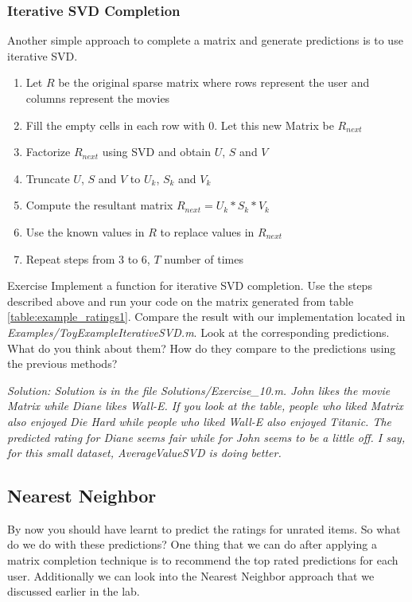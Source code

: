   \subsubsection{Iterative SVD Completion}
  Another simple approach to complete a matrix and generate predictions is to use iterative SVD. 
  \begin{enumerate}
    \item Let $R$ be the original sparse matrix where rows represent the user and columns represent the movies
    \item Fill the empty cells in each row with 0. Let this new Matrix be $R_{next}$
    \item Factorize $R_{next}$ using SVD and obtain $U$, $S$ and $V$
    \item Truncate $U$, $S$ and $V$ to $U_k$, $S_k$ and $V_k$
    \item Compute the resultant matrix $R_{next} = U_k*S_k*V_k$
    \item Use the known values in $R$ to replace values in $R_{next}$
    \item Repeat steps from $3$ to $6$, $T$ number of times
  \end{enumerate}
\begin{myremark}{Exercise }
Implement a function for iterative SVD completion. Use the steps described above and run your code on the matrix generated from table \ref{table:example_ratings1}. Compare the result with our implementation located in \textit{Examples/ToyExampleIterativeSVD.m}. Look at the corresponding predictions. What do you think about them? How do they compare to the predictions using the previous methods?
\end{myremark}
\textit{Solution: Solution is in the file Solutions/Exercise\_10.m. John likes the movie Matrix while Diane likes Wall-E. If you look at the table, people who liked Matrix also enjoyed Die Hard while people who liked Wall-E also enjoyed Titanic. The predicted rating for Diane seems fair while for John seems to be a little off. I say, for this small dataset, AverageValueSVD is doing better.}
  \subsection{Nearest Neighbor}
  By now you should have learnt to predict the ratings for unrated items. So what do we do with these predictions? One thing that we can do after applying a matrix completion technique is to recommend the top rated predictions for each user. Additionally we can look into the Nearest Neighbor approach that we discussed earlier in the lab.
